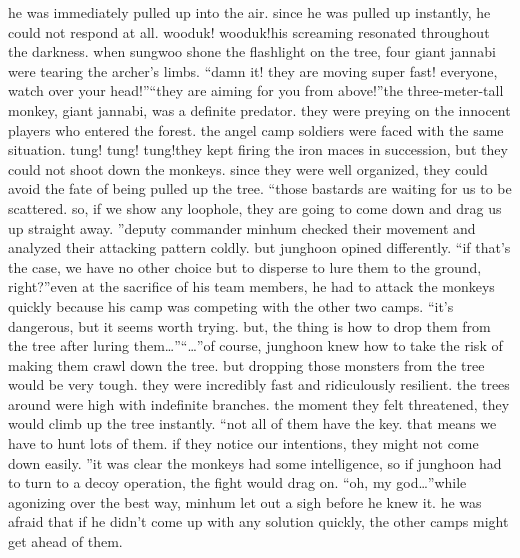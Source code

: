  he was immediately pulled up into the air.
 since he was pulled up instantly, he could not respond at all.
wooduk! wooduk!his screaming resonated throughout the darkness.
 when sungwoo shone the flashlight on the tree, four giant jannabi were tearing the archer’s limbs.
“damn it! they are moving super fast! everyone, watch over your head!”“they are aiming for you from above!”the three-meter-tall monkey, giant jannabi, was a definite predator.
 they were preying on the innocent players who entered the forest.
the angel camp soldiers were faced with the same situation.
tung! tung! tung!they kept firing the iron maces in succession, but they could not shoot down the monkeys.
since they were well organized, they could avoid the fate of being pulled up the tree.
“those bastards are waiting for us to be scattered.
 so, if we show any loophole, they are going to come down and drag us up straight away.
”deputy commander minhum checked their movement and analyzed their attacking pattern coldly.
but junghoon opined differently.
“if that’s the case, we have no other choice but to disperse to lure them to the ground, right?”even at the sacrifice of his team members, he had to attack the monkeys quickly because his camp was competing with the other two camps.
“it’s dangerous, but it seems worth trying.
 but, the thing is how to drop them from the tree after luring them…”“…”of course, junghoon knew how to take the risk of making them crawl down the tree.
but dropping those monsters from the tree would be very tough.
they were incredibly fast and ridiculously resilient.
 the trees around were high with indefinite branches.
 the moment they felt threatened, they would climb up the tree instantly.
“not all of them have the key.
 that means we have to hunt lots of them.
 if they notice our intentions, they might not come down easily.
”it was clear the monkeys had some intelligence, so if junghoon had to turn to a decoy operation, the fight would drag on.
“oh, my god…”while agonizing over the best way, minhum let out a sigh before he knew it.
he was afraid that if he didn’t come up with any solution quickly, the other camps might get ahead of them.


